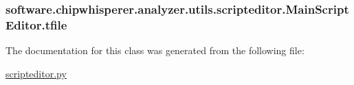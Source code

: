 \subsubsection[{tfile}]{\setlength{\rightskip}{0pt plus 5cm}software.\+chipwhisperer.\+analyzer.\+utils.\+scripteditor.\+Main\+Script\+Editor.\+tfile}\label{classsoftware_1_1chipwhisperer_1_1analyzer_1_1utils_1_1scripteditor_1_1MainScriptEditor_aa6e21875491751da79b52b4e7f2f772a}


The documentation for this class was generated from the following file\+:\begin{DoxyCompactItemize}
\item 
\hyperlink{scripteditor_8py}{scripteditor.\+py}\end{DoxyCompactItemize}
